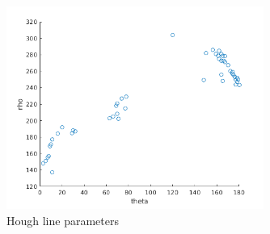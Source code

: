 \documentclass[12pt]{article}
\begin{document}
\subsection{}
\begin{figure}[H] \centering \includegraphics[page=1,width=0.75\textwidth]{thetas_rhos}
\caption{Hough line parameters}    \end{figure}   


\newpage
\end{document}
